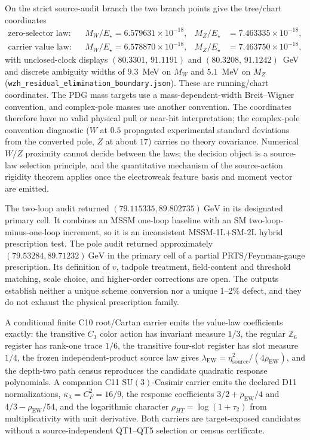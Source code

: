 \documentclass[11pt]{article}
\newcommand{\SU}{\mathrm{SU}}
\begin{document}
On the strict source-audit branch the two branch points give the tree/chart
coordinates
\[
\begin{aligned}
\text{zero-selector law:}\quad
&M_W/E_\star=6.579631\times10^{-18}, &
M_Z/E_\star&=7.463335\times10^{-18},\\
\text{carrier value law:}\quad
&M_W/E_\star=6.578870\times10^{-18}, &
M_Z/E_\star&=7.463750\times10^{-18},
\end{aligned}
\]
with unclosed-clock displays \((80.3301,\,91.1191)\) and
\((80.3208,\,91.1242)\)~GeV and discrete ambiguity widths of \(9.3\)~MeV on
\(M_W\) and \(5.1\)~MeV on \(M_Z\)
(\texttt{wzh\_residual\_elimination\_boundary.json}). These are running/chart
coordinates. The PDG mass targets use a mass-dependent-width Breit--Wigner convention, and
complex-pole masses use another convention. The coordinates therefore have no valid physical
pull or near-hit interpretation; the complex-pole convention diagnostic (\(W\) at \(0.5\)
propagated experimental standard deviations from the converted pole, \(Z\) at about \(17\))
carries no theory covariance. Numerical \(W/Z\) proximity cannot decide between the laws;
the decision object is a source-law
selection principle, and the quantitative mechanism of the source-action
rigidity theorem applies once the electroweak feature basis and moment vector
are emitted.

The two-loop audit returned \((79.115335,89.802735)~\mathrm{GeV}\) in its designated primary
cell. It combines an MSSM one-loop baseline with an SM two-loop-minus-one-loop increment, so it is
an inconsistent MSSM-1L+SM-2L hybrid prescription test. The pole audit returned approximately
\((79.53284,89.71232)~\mathrm{GeV}\) in the primary cell of a partial
PRTS/Feynman-gauge prescription. Its definition of \(v\), tadpole treatment, field-content and
threshold matching, scale choice, and higher-order corrections are open. The outputs establish
neither a unique scheme conversion nor a unique \(1\)--\(2\%\) defect, and they do not exhaust
the physical prescription family.

A conditional finite C10 root/Cartan carrier emits the value-law coefficients
exactly: the transitive \(C_3\) color action has invariant measure \(1/3\),
the regular \(\mathbb Z_6\) register has rank-one trace \(1/6\), the
transitive four-slot register has slot measure \(1/4\), the frozen
independent-product source law gives
\(\lambda_{\mathrm{EW}}=\eta_{\mathrm{source}}^2/(4\rho_{\mathrm{EW}})\), and
the depth-two path census reproduces the candidate quadratic response
polynomials.  A companion C11 \(\SU(3)\)-Casimir carrier emits the declared
D11 normalizations, \(\kappa_\lambda=C_F^2=16/9\), the response coefficients
\(3/2+\rho_{\mathrm{EW}}/4\) and \(4/3-\rho_{\mathrm{EW}}/54\), and the
logarithmic character \(\rho_{HT}=\log(1+\tau_2)\) from multiplicativity with
unit derivative. Both carriers are target-exposed candidates without a
source-independent QT1--QT5 selection or census certificate.
\end{document}
